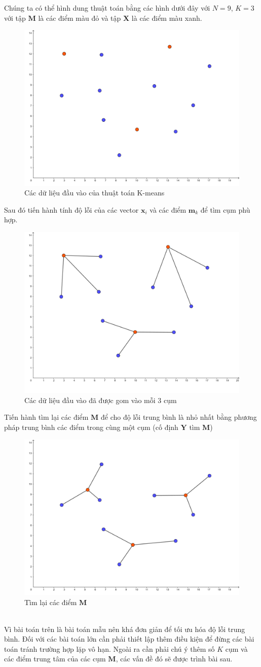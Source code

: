 \documentclass{article}
\begin{document}
Chúng ta có thể hình dung thuật toán bằng các hình dưới đây với $N = 9$, $K = 3$ với tập $\mathbf{M}$ là các điểm màu đỏ và tập $\mathbf{X}$ là các điểm màu xanh.
	\begin{figure}[h]
		\centering
		\includegraphics[width = 0.6\linewidth]{img/1}
		\caption{Các dữ liệu đầu vào của thuật toán K-means}
		\label{fig:figure2}
	\end{figure}
	\newpage
	Sau đó tiến hành tính độ lỗi của các vector $\mathbf{x}_i$ và các điểm $\mathbf{m}_k$ để tìm cụm phù hợp.

	\begin{figure}[h]
		\centering
		\includegraphics[width = 0.6\linewidth]{img/2}
		\caption{Các dữ liệu đầu vào đã được gom vào mỗi 3 cụm}
		\label{fig:figure4}
	\end{figure}
	Tiến hành tìm lại các điểm $\mathbf{M}$ để cho độ lỗi trung bình là nhỏ nhất bằng phương pháp trung bình các điểm trong cùng một cụm (cố định $\mathbf{Y}$ tìm $\mathbf{M}$)
	\begin{figure}[h]
		\centering
		\includegraphics[width = 0.6\linewidth]{img/3}
		\caption{Tìm lại các điểm $\mathbf{M}$}
		\label{fig:figure5}
	\end{figure}
	\\
	Vì bài toán trên là bài toán mẫu nên khá đơn giản để tối ưu hóa độ lỗi trung bình. Đối với các bài toán lớn cần phải thiết lập thêm điều kiện để đừng các bài toán tránh trường hợp lặp vô hạn. Ngoài ra cần phải chú ý thêm số $K$ cụm và các điểm trung tâm của các cụm $\mathbf{M}$, các vấn đề đó sẽ được trình bài sau.
	\newpage
\end{document}
